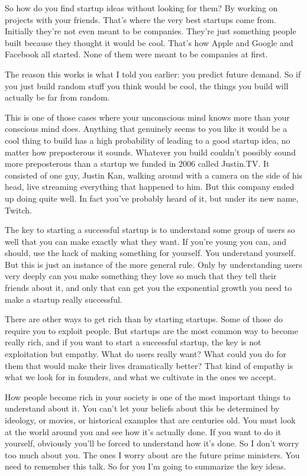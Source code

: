 So how do you find startup ideas without looking for them? By working on
projects with your friends. That's where the very best startups come
from. Initially they're not even meant to be companies. They're just
something people built because they thought it would be cool. That's how
Apple and Google and Facebook all started. None of them were meant to be
companies at first.

The reason this works is what I told you earlier: you predict future
demand. So if you just build random stuff you think would be cool, the
things you build will actually be far from random.

This is one of those cases where your unconscious mind knows more than
your conscious mind does. Anything that genuinely seems to you like it
would be a cool thing to build has a high probability of leading to a
good startup idea, no matter how preposterous it sounds. Whatever you
build couldn't possibly sound more preposterous than a startup we funded
in 2006 called Justin.TV. It consisted of one guy, Justin Kan, walking
around with a camera on the side of his head, live streaming everything
that happened to him. But this company ended up doing quite well. In
fact you've probably heard of it, but under its new name, Twitch.

The key to starting a successful startup is to understand some group of
users so well that you can make exactly what they want. If you're young
you can, and should, use the hack of making something for yourself. You
understand yourself. But this is just an instance of the more general
rule. Only by understanding users very deeply can you make something
they love so much that they tell their friends about it, and only that
can get you the exponential growth you need to make a startup really
successful.

There are other ways to get rich than by starting startups. Some of
those do require you to exploit people. But startups are the most common
way to become really rich, and if you want to start a successful
startup, the key is not exploitation but empathy. What do users really
want? What could you do for them that would make their lives
dramatically better? That kind of empathy is what we look for in
founders, and what we cultivate in the ones we accept.

How people become rich in your society is one of the most important
things to understand about it. You can't let your beliefs about this be
determined by ideology, or movies, or historical examples that are
centuries old. You must look at the world around you and see how it's
actually done. If you want to do it yourself, obviously you'll be forced
to understand how it's done. So I don't worry too much about you. The
ones I worry about are the future prime ministers. You need to remember
this talk. So for you I'm going to summarize the key ideas.

